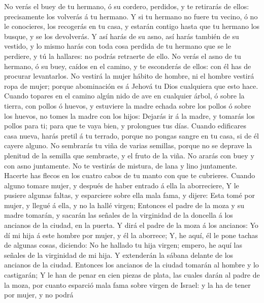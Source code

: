  No verás el buey de tu hermano, ó su cordero, perdidos, y
te retirarás de ellos: precisamente los volverás á tu hermano.
 Y si tu hermano no fuere tu vecino, ó no le conocieres,
los recogerás en tu casa, y estarán contigo hasta que tu hermano los
busque, y se los devolverás.  Y así harás de su asno, así
harás también de su vestido, y lo mismo harás con toda cosa perdida de
tu hermano que se le perdiere, y tú la hallares: no podrás retraerte de
ello.  No verás el asno de tu hermano, ó su buey, caídos
en el camino, y te esconderás de ellos: con él has de procurar
levantarlos.  No vestirá la mujer hábito de hombre, ni el
hombre vestirá ropa de mujer; porque abominación es á Jehová tu Dios
cualquiera que esto hace.  Cuando topares en el camino
algún nido de ave en cualquier árbol, ó sobre la tierra, con pollos ó
huevos, y estuviere la madre echada sobre los pollos ó sobre los huevos,
no tomes la madre con los hijos:  Dejarás ir á la madre, y
tomarás los pollos para ti; para que te vaya bien, y prolongues tus
días.  Cuando edificares casa nueva, harás pretil á tu
terrado, porque no pongas sangre en tu casa, si de él cayere alguno.
 No sembrarás tu viña de varias semillas, porque no se
deprave la plenitud de la semilla que sembraste, y el fruto de la viña.
 No ararás con buey y con asno juntamente.
 No te vestirás de mistura, de lana y lino juntamente.
 Hacerte has flecos en los cuatro cabos de tu manto con
que te cubrieres.  Cuando alguno tomare mujer, y después
de haber entrado á ella la aborreciere,  Y le pusiere
algunas faltas, y esparciere sobre ella mala fama, y dijere: Esta tomé
por mujer, y llegué á ella, y no la hallé virgen; 
Entonces el padre de la moza y su madre tomarán, y sacarán las señales
de la virginidad de la doncella á los ancianos de la ciudad, en la
puerta.  Y dirá el padre de la moza á los ancianos: Yo dí
mi hija á este hombre por mujer, y él la aborrece;  Y, he
aquí, él le pone tachas de algunas cosas, diciendo: No he hallado tu
hija virgen; empero, he aquí las señales de la virginidad de mi hija. Y
extenderán la sábana delante de los ancianos de la ciudad.
 Entonces los ancianos de la ciudad tomarán al hombre y
lo castigarán;  Y le han de penar en cien piezas de
plata, las cuales darán al padre de la moza, por cuanto esparció mala
fama sobre virgen de Israel: y la ha de tener por mujer, y no podrá

